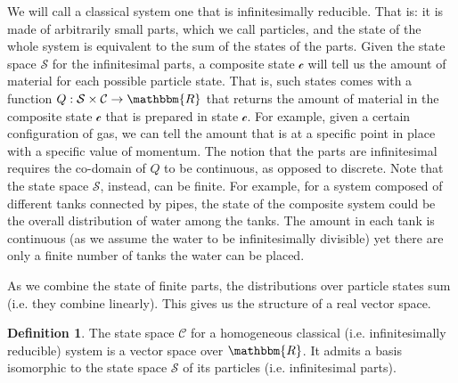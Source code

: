 \documentclass[aps,pra,10pt,twocolumn,floatfix,nofootinbib]{revtex4-1}
\theoremstyle{definition}
\newtheorem{defn}[prop]{Definition}
\begin{document}
We will call a classical system one that is infinitesimally reducible. That is: it is made of arbitrarily small parts, which we call particles, and the state of the whole system is equivalent to the sum of the states of the parts. Given the state space $\mathcal{S}$ for the infinitesimal parts, a composite state $\mathcal{c}$ will tell us the amount of material for each possible particle state. That is, such states comes with a function $Q: \mathcal{S}\times\mathcal{C} \to \mathbbm{R}$ that returns the amount of material in the composite state $\mathcal{c}$ that is prepared in state $\mathcal{c}$. For example, given a certain configuration of gas, we can tell the amount that is at a specific point in place with a specific value of momentum. The notion that the parts are infinitesimal requires the co-domain of $Q$ to be continuous, as opposed to discrete. Note that the state space $\mathcal{S}$, instead, can be finite. For example, for a system composed of different tanks connected by pipes, the state of the composite system could be the overall distribution of water among the tanks. The amount in each tank is continuous (as we assume the water to be infinitesimally divisible) yet there are only a finite number of tanks the water can be placed.

As we combine the state of finite parts, the distributions over particle states sum (i.e. they combine linearly). This gives us the structure of a real vector space.

\begin{defn}\label{classical_vector space}
The state space $\mathcal{C}$ for a homogeneous classical (i.e. infinitesimally reducible) system is a vector space over $\mathbbm{R}$. It admits a basis isomorphic to the state space $\mathcal{S}$ of its particles (i.e. infinitesimal parts).
\end{defn}
\end{document}
